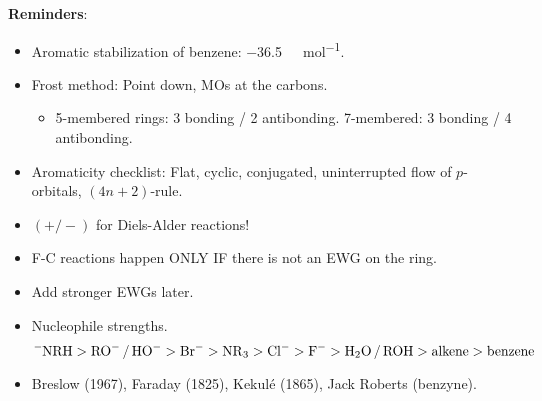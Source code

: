 \documentclass[../notes.tex]{subfiles}
\begin{document}
\textbf{Reminders}:
\begin{itemize}
    \item Aromatic stabilization of benzene: \SI[per-mode=symbol]{-36.5}{\kilo\calorie\per\mole}.
    \item Frost method: Point down, MOs at the carbons.
    \begin{itemize}
        \item 5-membered rings: 3 bonding / 2 antibonding. 7-membered: 3 bonding / 4 antibonding.
    \end{itemize}
    \item Aromaticity checklist: Flat, cyclic, conjugated, uninterrupted flow of $p$-orbitals, $(4n+2)$-rule.
    \item $(+/-)$ for Diels-Alder reactions!
    \item F-C reactions happen ONLY IF there is not an EWG on the ring.
    \item Add stronger EWGs later.
    \item Nucleophile strengths.
    \begin{equation*}
        \ce{{}^-NRH} > \ce{RO- / HO-}
        > \ce{Br-}
        > \ce{NR3}
        > \ce{Cl-}
        > \ce{F-}
        > \ce{H2O / ROH}
        > \text{alkene}
        > \text{benzene}
    \end{equation*}
    \item Breslow (1967), Faraday (1825), Kekul\'{e} (1865), Jack Roberts (benzyne).
\end{itemize}
\end{document}
